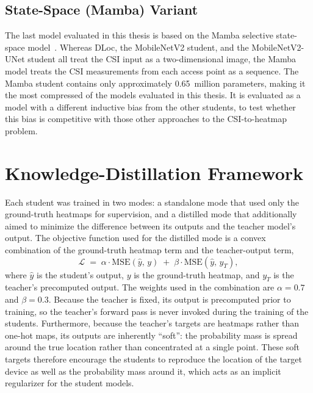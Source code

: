 \subsection{State-Space (Mamba) Variant}
\label{sec:method:mamba}

The last model evaluated in this thesis is based on the Mamba selective state-space
model~\cite{gu2023mamba}. Whereas DLoc, the MobileNetV2 student, and the MobileNetV2-UNet student all
treat the CSI input as a two-dimensional image, the Mamba model treats the CSI measurements from each
access point as a sequence. The Mamba student contains only approximately 0.65~million parameters, making
it the most compressed of the models evaluated in this thesis. It is evaluated as a model with a
different inductive bias from the other students, to test whether this bias is competitive with those
other approaches to the CSI-to-heatmap problem.

\section{Knowledge-Distillation Framework}
\label{sec:method:distillation}

Each student was trained in two modes: a standalone mode that used only the ground-truth heatmaps for
supervision, and a distilled mode that additionally aimed to minimize the difference between its outputs
and the teacher model's output. The objective function used for the distilled mode is a convex
combination of the ground-truth heatmap term and the teacher-output term,
\begin{equation}
  \mathcal{L} \;=\; \alpha \cdot \mathrm{MSE}(\hat{y},\, y) \;+\; \beta \cdot \mathrm{MSE}(\hat{y},\, y_T),
  \label{eq:method:distill}
\end{equation}
where $\hat{y}$ is the student's output, $y$ is the ground-truth heatmap, and $y_T$ is the teacher's
precomputed output. The weights used in the combination are $\alpha = 0.7$ and $\beta = 0.3$. Because the
teacher is fixed, its output is precomputed prior to training, so the teacher's forward pass is never
invoked during the training of the students. Furthermore, because the teacher's targets are heatmaps
rather than one-hot maps, its outputs are inherently ``soft'': the probability mass is spread around the
true location rather than concentrated at a single point. These soft targets therefore encourage the
students to reproduce the location of the target device as well as the probability mass around it, which
acts as an implicit regularizer for the student models.


